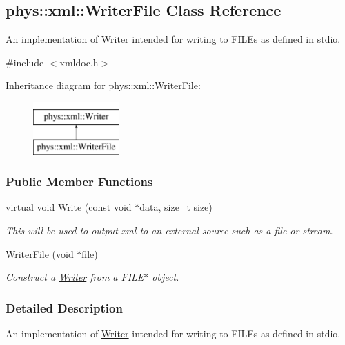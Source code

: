 \hypertarget{classphys_1_1xml_1_1WriterFile}{
\subsection{phys::xml::WriterFile Class Reference}
\label{classphys_1_1xml_1_1WriterFile}
}


An implementation of \hyperlink{classphys_1_1xml_1_1Writer}{Writer} intended for writing to FILEs as defined in stdio.  




{\ttfamily \#include $<$xmldoc.h$>$}

Inheritance diagram for phys::xml::WriterFile:\begin{figure}[H]
\begin{center}
\leavevmode
\includegraphics[height=2.000000cm]{classphys_1_1xml_1_1WriterFile}
\end{center}
\end{figure}
\subsubsection*{Public Member Functions}
\begin{DoxyCompactItemize}
\item 
virtual void \hyperlink{classphys_1_1xml_1_1WriterFile_afb46a51336fd6072e8c774da8af31172}{Write} (const void $\ast$data, size\_\-t size)
\begin{DoxyCompactList}\small\item\em This will be used to output xml to an external source such as a file or stream. \item\end{DoxyCompactList}\item 
\hyperlink{classphys_1_1xml_1_1WriterFile_aba665d4dc17c956798a80cb4e8c2774d}{WriterFile} (void $\ast$file)
\begin{DoxyCompactList}\small\item\em Construct a \hyperlink{classphys_1_1xml_1_1Writer}{Writer} from a FILE$\ast$ object. \item\end{DoxyCompactList}\end{DoxyCompactItemize}


\subsubsection{Detailed Description}
An implementation of \hyperlink{classphys_1_1xml_1_1Writer}{Writer} intended for writing to FILEs as defined in stdio. 

